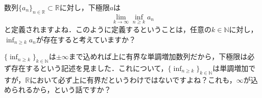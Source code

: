 \documentclass[12pt]{jarticle}
\numberwithin{equation}{section}    %
\numberwithin{figure}{section}      %
\numberwithin{table}{section}      %
\begin{document}
数列$\{a_{n}\}_{n \in \mathbb{R}} \subset \mathbb{R}$に対し，下極限$a$は
\begin{equation}
    \lim_{k \to \infty} \inf_{n \ge k} a_{n}
\end{equation}
と定義されますよね．このように定義するということは，任意の$k \in \mathbb{N}$に対し，$\inf_{n \ge k} a_{n}$が存在すると考えていますか？

$\{\inf_{n \ge k}\}_{k \in \mathbb{N}}$は$\pm \infty$まで込めれば上に有界な単調増加数列だから，下極限は必ず存在するという記述を見ました．これについて，$\{\inf_{n \ge k}\}_{k \in \mathbb{N}}$は単調増加ですが，$\mathbb{R}$において必ず上に有界だというわけではないですよね？これも，$\infty$が込められるから，という話ですか？
\end{document}
